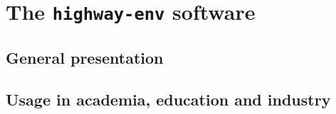 
\graphicspath{{2-Chapters/3-Chapter/}}

\chapter{The \texttt{highway-env} software}
\label{chapter:3}

\section{General presentation}
\section{Usage in academia, education and industry}